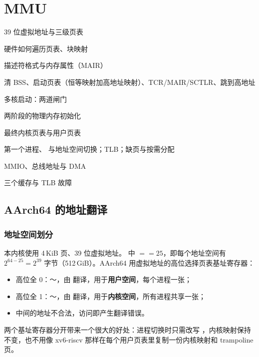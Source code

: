 \chapter{MMU}
\label{chap:mmu}

\begin{introduction}[本章内容]
  \item 39 位虚拟地址与三级页表
  \item 硬件如何遍历页表、块映射
  \item 描述符格式与内存属性（MAIR）
  \item 清 BSS、启动页表（恒等映射加高地址映射）、TCR/MAIR/SCTLR、跳到高地址
  \item 多核启动：两道闸门
  \item 两阶段的物理内存初始化
  \item 最终内核页表与用户页表
  \item 第一个进程、 与地址空间切换；TLB；缺页与按需分配
  \item MMIO、总线地址与 DMA
  \item 三个缓存与 TLB 故障
\end{introduction}

\section{AArch64 的地址翻译}

\subsection{地址空间划分}

本内核使用 4\,KiB 页、39 位虚拟地址。 中 $=$$=25$，即每个地址空间有 $2^{64-25}=2^{39}$ 字节（512\,GiB）。AArch64 用虚拟地址的高位选择页表基址寄存器：

\begin{itemize}
  \item 高位全 0：～，由  翻译，用于\textbf{用户空间}，每个进程一张；
  \item 高位全 1：～，由  翻译，用于\textbf{内核空间}，所有进程共享一张；
  \item 中间的地址不合法，访问即产生翻译错误。
\end{itemize}

两个基址寄存器分开带来一个很大的好处：进程切换时只需改写 ，内核映射保持不变，也不用像 xv6-riscv 那样在每个用户页表里复制一份内核映射和 trampoline 页。

